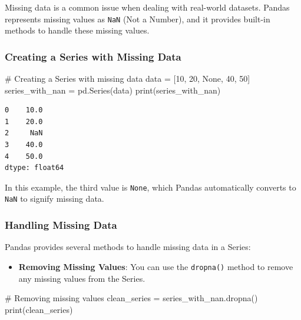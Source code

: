 \documentclass[
  letterpaper,
  DIV=11,
  numbers=noendperiod]{scrreprt}
\newenvironment{Shaded}{\begin{snugshade}}{\end{snugshade}}
\newcommand{\BuiltInTok}[1]{\textcolor[rgb]{0.00,0.23,0.31}{#1}}
\newcommand{\CommentTok}[1]{\textcolor[rgb]{0.37,0.37,0.37}{#1}}
\newcommand{\DecValTok}[1]{\textcolor[rgb]{0.68,0.00,0.00}{#1}}
\newcommand{\NormalTok}[1]{\textcolor[rgb]{0.00,0.23,0.31}{#1}}
\newcommand{\OperatorTok}[1]{\textcolor[rgb]{0.37,0.37,0.37}{#1}}
\newcommand{\VariableTok}[1]{\textcolor[rgb]{0.07,0.07,0.07}{#1}}
\providecommand{\tightlist}{%
  \setlength{\itemsep}{0pt}\setlength{\parskip}{0pt}}\usepackage{longtable,booktabs,array}
\begin{document}
Missing data is a common issue when dealing with real-world datasets.
Pandas represents missing values as \texttt{NaN} (Not a Number), and it
provides built-in methods to handle these missing values.

\hypertarget{creating-a-series-with-missing-data}{%
\subsubsection{Creating a Series with Missing
Data}\label{creating-a-series-with-missing-data}}

\begin{Shaded}
\begin{Highlighting}[]
\CommentTok{\# Creating a Series with missing data}
\NormalTok{data }\OperatorTok{=}\NormalTok{ [}\DecValTok{10}\NormalTok{, }\DecValTok{20}\NormalTok{, }\VariableTok{None}\NormalTok{, }\DecValTok{40}\NormalTok{, }\DecValTok{50}\NormalTok{]}
\NormalTok{series\_with\_nan }\OperatorTok{=}\NormalTok{ pd.Series(data)}
\BuiltInTok{print}\NormalTok{(series\_with\_nan)}
\end{Highlighting}
\end{Shaded}

\begin{verbatim}
0    10.0
1    20.0
2     NaN
3    40.0
4    50.0
dtype: float64
\end{verbatim}

In this example, the third value is \texttt{None}, which Pandas
automatically converts to \texttt{NaN} to signify missing data.

\hypertarget{handling-missing-data}{%
\subsubsection{Handling Missing Data}\label{handling-missing-data}}

Pandas provides several methods to handle missing data in a Series:

\begin{itemize}
\tightlist
\item
  \textbf{Removing Missing Values}: You can use the \texttt{dropna()}
  method to remove any missing values from the Series.
\end{itemize}

\begin{Shaded}
\begin{Highlighting}[]
\CommentTok{\# Removing missing values}
\NormalTok{clean\_series }\OperatorTok{=}\NormalTok{ series\_with\_nan.dropna()}
\BuiltInTok{print}\NormalTok{(clean\_series)}
\end{Highlighting}
\end{Shaded}
\end{document}
